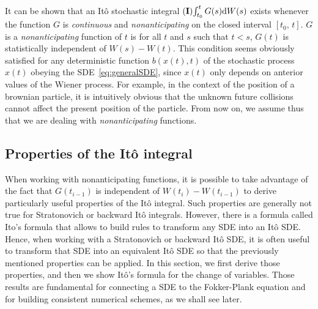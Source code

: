 It can be shown that an Itô stochastic integral $\mathbf{(I)\!}\int_{t_0}^t G(s) \mathrm dW(s)$ exists whenever the function $G$ is \textit{continuous} and \textit{nonanticipating} on the closed interval $[t_0,\,t]$. $G$ is a \textit{nonanticipating} function of $t$ is for all $t$ and $s$ such that $t<s$, $G(t)$ is statistically independent of $W(s)-W(t)$. This condition seems obviously satisfied for any deterministic function $b(x(t),t)$ of the stochastic process $x(t)$ obeying the SDE~\eqref{eq:generalSDE}, since $x(t)$ only depends on anterior values of the Wiener process. For example, in the context of the position of a brownian particle, it is intuitively obvious that the unknown future collisions cannot affect the present position of the particle. From now on, we assume thus that we are dealing with \textit{nonanticipating} functions.

\subsection{Properties of the Itô integral}
When working with nonanticipating functions, it is possible to take advantage of the fact that $G(t_{i-1})$ is independent of $W(t_i) - W(t_{i-1})$ to derive particularly useful properties of the Itô integral. Such properties are generally not true for Stratonovich or backward Itô integrals. However, there is a formula called Ito's formula that allows to build rules to transform any SDE into an Itô SDE. Hence, when working with a Stratonovich or backward Itô SDE, it is often useful to transform that SDE into an equivalent Itô SDE so that the previously mentioned properties can be applied. In this section, we first derive those properties, and then we show Itô's formula for the change of variables. Those results are fundamental for connecting a SDE to the Fokker-Plank equation and for building consistent numerical schemes, as we shall see later.
